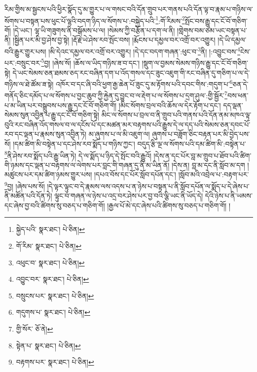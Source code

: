 རིམ་གྱིས་མ་སྦྱངས་པའི་ཕྱིར་སྣོད་དུ་མ་གྱུར་པ་ལ་གསང་བའི་དོན་གྲུབ་པར་གནས་པའི་དོན་ལྟ་བ་རྣམ་པ་གཉིས་ལ་སོགས་པ་བསྟན་པས་ཕུང་པོ་ལྷའི་བདག་ཉིད་ལ་སོགས་པ་:བསྐྱེད་པའི་\footnote{སྐྱེད་པའི་  སྣར་ཐང་།  པེ་ཅིན། }:གོ་རིམས་\footnote{གོ་རིམ་  སྣར་ཐང་།  པེ་ཅིན། }སྤོང་བས་རྒྱུ་དང་ངོ་བོ་གཅིག་གོ། །དེ་ཡང་། ལྷ་ཡི་གཟུགས་ནི་བསྒོམས་པ་ལ། །སེམས་ཀྱི་བརྩོན་པ་དག་ལ་ནི། །གླེགས་བམ་ཙམ་ཡང་བསྟན་པ་ནི། །སྦྱིན་པར་མི་བྱ་ཤེས་བྱ་སྟེ། །རྡོ་རྗེ་ཡེ་ཤེས་རབ་སྤོང་བས། །རྨོངས་པ་དམྱལ་བར་འགྲོ་བར་འགྱུར། །དེ་ཡི་དམྱལ་བའི་རྒྱུར་གྱུར་པས། །མི་དེའང་དམྱལ་བར་འགྲོ་བར་འགྱུར། །དེ་དང་བདག་གཞན་:ཕུང་བ་\footnote{འཕུང་བ་  སྣར་ཐང་།  པེ་ཅིན། }ནི། །:འབྱུང་བས་\footnote{འབྱུང་བར་  སྣར་ཐང་།  པེ་ཅིན། }ངེས་པར་:བསྲུང་བར་\footnote{བསྲུངས་པར་  སྣར་ཐང་།  པེ་ཅིན། }བྱ། །ཞེས་སོ། །ཆོས་ལ་ཡིད་གཉིས་ཟ་བ་དང་། །སྡུག་ལ་བྱམས་སེམས་གཉིས་རྒྱུ་དང་ངོ་བོ་གཅིག་སྟེ། དེ་ཡང་སེམས་ཅན་ཐམས་ཅད་རང་བཞིན་དག་པ་འོད་གསལ་དང་ཟུང་འཇུག་གི་རང་བཞིན་དུ་གཅིག་པ་ལ་དེ་གཉིས་ལ་ཐེ་ཚོམ་ཟ་སྟེ། འཁོར་བ་དང་ཞི་བའི་ཕྱག་རྒྱ་ཆེན་པོ་ཟུང་དུ་མ་རྟོགས་པའི་དབང་གིས་:གདུག་པ་\footnote{གདུགས་པ་  སྣར་ཐང་།  པེ་ཅིན། }ཅན་དེ་གནོད་ཅིང་དམོད་པ་ལ་སོགས་པ་བྱང་ཆུབ་ཀྱི་རྐྱེན་དུ་བྱུང་བ་ལ་རྡེག་པ་ལ་སོགས་པ་དྲག་ཤུལ་:གྱི་སྦྱོར་\footnote{གྱི་སོར་  ཅོ་ནེ། }བས་ཕན་པ་མ་ཡིན་པར་བསྒྲུབས་པས་རྒྱུ་དང་ངོ་བོ་གཅིག་གོ། །མིང་སོགས་བྲལ་བའི་ཆོས་ལ་དེར་རྟོག་པ་དང་། དད་ལྡན་སེམས་སུན་འབྱིན་པ་རྒྱུ་དང་ངོ་བོ་གཅིག་སྟེ། མིང་ལ་སོགས་པ་བྲལ་བ་ནི་གྲུབ་པའི་གནས་པའི་དོན་ནམ་མཁའ་ལྟ་བུའི་རང་བཞིན་འོད་གསལ་བ་ལ་དངོས་པོ་དང་མཚན་མར་བརྟགས་པའི་རྒྱུས་དེ་ལ་དད་པའི་སེམས་ཅན་དབང་པོ་རབ་དང་ལྡན་པ་རྣམས་སུན་འབྱིན་ཏེ། མ་ཞུགས་པ་ལ་མི་འཇུག་ལ། ཞུགས་པ་བཟློག་ཅིང་བརྟན་པར་མི་བྱེད་པས་སོ། །དམ་ཚིག་མི་བསྟེན་པ་དང་ཤེས་རབ་སྨོད་པ་གཉིས་ཀྱང་། བདུད་རྩི་ལྔ་ལ་སོགས་པའི་དམ་ཚིག་མི་:བསྟེན་པ་\footnote{སྟེན་པ་  སྣར་ཐང་།  པེ་ཅིན། }ནི་ཤེས་རབ་སྨོད་པའི་རྒྱུ་ཡིན་ཏེ། དེ་ལ་སྨོད་པ་ཉིད་དེ་སྤོང་བའི་རྒྱུའོ། །དེས་ན་དང་པོར་བླ་མ་གྲུབ་པ་ཐོབ་པའི་ཚིག་གི་ཉམས་དང་ལྡན་པ་བརྟགས་ལ་ལེགས་པར་བླང་གི་གཞན་དུ་ནི་མ་ཡིན་ནོ། །དེས་ན། བླ་མ་དང་ནི་སློབ་མ་དག །མཚུངས་པར་དམ་ཚིག་ཉམས་གྱུར་པས། །དཔའ་བོས་དང་པོར་སློབ་དཔོན་དང་། །སློབ་མའི་འབྲེལ་པ་:བརྟག་པར་\footnote{བརྟགས་པར་  སྣར་ཐང་།  པེ་ཅིན། }བྱ། །ཞེས་པས་སོ། །དེ་ལྟར་ལྟུང་བ་དེ་རྣམས་ལས་འདས་པ་ན་ཉེས་པ་བསྟན་པ་ནི་སློབ་དཔོན་ལ་སྨོད་པ་དེ་ཞེས་པ་ནི་མཚོན་པའི་དོན་ཏེ། ལྟུང་བ་གཞན་ལ་ཉེས་པ་འདྲ་བར་ཤེས་པར་བྱ་བའི་ལྕི་ཡང་ནི་ཡོད་དེ། དེའི་ཉེས་པ་ནི་ཡམས་དང་ཞེས་བྱ་བའི་ཚིགས་སུ་བཅད་པ་གཅིག་གོ། །རྒྱལ་པོ་མེ་དང་ཞེས་པའི་ཚིགས་སུ་བཅད་པ་གཅིག་གོ། །
